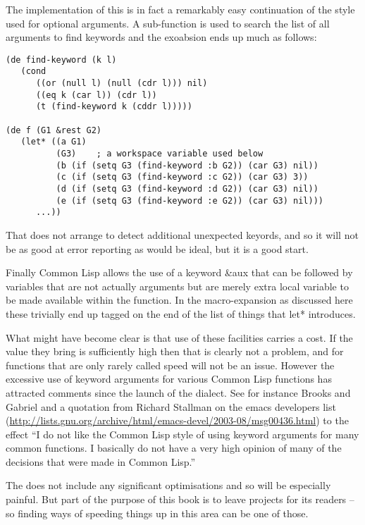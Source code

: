 The implementation of this is in fact a remarkably easy continuation of the
style used for optional arguments. A sub-function is used to search the list of
all arguments to find keywords and the exoabsion ends up much
as follows:
{\small\begin{verbatim}
(de find-keyword (k l)
   (cond
      ((or (null l) (null (cdr l))) nil)
      ((eq k (car l)) (cdr l))
      (t (find-keyword k (cddr l)))))

(de f (G1 &rest G2)
   (let* ((a G1)
          (G3)    ; a workspace variable used below
          (b (if (setq G3 (find-keyword :b G2)) (car G3) nil))
          (c (if (setq G3 (find-keyword :c G2)) (car G3) 3))
          (d (if (setq G3 (find-keyword :d G2)) (car G3) nil))
          (e (if (setq G3 (find-keyword :e G2)) (car G3) nil)))
      ...))
\end{verbatim}}

That does not arrange to detect additional unexpected keyords, and so
it will not be as good at error reporting as would be ideal, but it
is a good start.

Finally Common Lisp allows the use of a keyword {\tx \&aux} that can be
followed by variables that are not actually arguments but are merely
extra local variable to be made available within the function. In the
macro-expansion as discussed here these trivially end up tagged on the
end of the list of things that {\tx let*} introduces.

What might have become clear is that use of these facilities carries a cost.
If the value they bring is sufficiently high then that is clearly not
a problem, and for functions that are only rarely called speed will not
be an issue. However the excessive use of keyword arguments for
various Common Lisp functions has attracted comments since the launch
of the dialect. See for instance
Brooks and Gabriel\cite{Brooks:1984:CCL} and a quotation from Richard Stallman
on the {\tx emacs} developers list
(\url{http://lists.gnu.org/archive/html/emacs-devel/2003-08/msg00436.html})
to the effect ``I do not like the Common Lisp style of using keyword arguments
for many common functions.  I basically do not have a very high
opinion of many of the decisions that were made in Common Lisp.''

The \vcl{} does not include any significant optimisations and so will
be especially painful. But part of the purpose of this book is to leave
projects for its readers -- so finding ways of speeding things up in this
area can be one of those.

